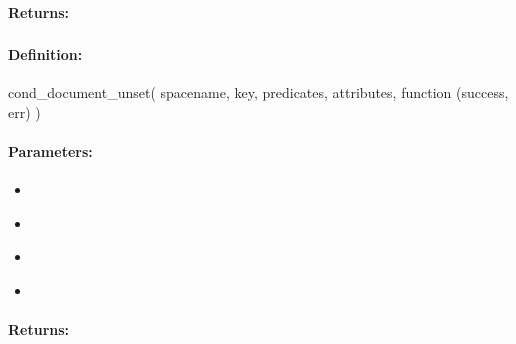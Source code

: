 \paragraph{Returns:}


\pagebreak
\subsubsection{}
\label{api:nodejs:cond_document_unset}


\paragraph{Definition:}
\begin{javascriptcode}
cond_document_unset(
        spacename, key, predicates, attributes, function (success, err) {})
\end{javascriptcode}
\paragraph{Parameters:}
\begin{itemize}[noitemsep]
\item {}\\

\item {}\\

\item {}\\

\item {}\\

\end{itemize}

\paragraph{Returns:}


\pagebreak
\subsubsection{}
\label{api:nodejs:group_document_unset}


